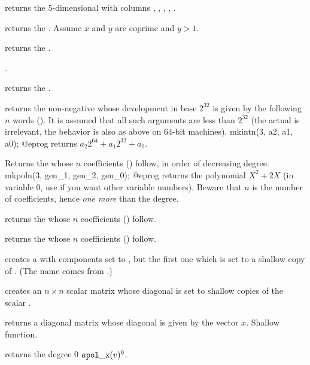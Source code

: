 returns the $5$-dimensional  with columns
, , , , .

returns the  . Assume $x$ and $y$ are coprime and $y > 1$.

returns the  .

.

returns the  .

\smallskip

 returns the non-negative  whose
development in base $2^{32}$ is given by the following $n$ words
(). It is assumed that all such arguments are less than
$2^{32}$ (the actual  is irrelevant, the behavior is also
as above on $64$-bit machines).
\bprog
  mkintn(3, a2, a1, a0);
@eprog
\noindent returns $a_2 2^{64} + a_1 2^{32} + a_0$.

 Returns the  whose $n$
coefficients () follow, in order of decreasing degree.
\bprog
  mkpoln(3, gen_1, gen_2, gen_0);
@eprog
\noindent returns the polynomial $X^2 + 2X$ (in variable $0$, use
 if you want other variable numbers). Beware that $n$ is the
number of coefficients, hence \emph{one more} than the degree.

 returns the  whose $n$
coefficients () follow.

 returns the  whose $n$
coefficients () follow.

 creates a  with 
components set to , but the first one which is set to a shallow
copy of . (The name comes from .)

 creates an $n\times n$
scalar matrix whose diagonal is set to shallow copies of the scalar .

 returns a diagonal matrix whose diagonal
is given by the vector $x$. Shallow function.

 returns the degree 0
 $a {\tt pol\_x}(v)^0$.

